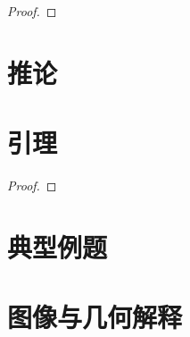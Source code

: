 \documentclass[
    lang=cn,
    color=blue,
    mode=fancy,
    thmcnt=section,
    scheme=chinese
]{elegantbook}
\begin{document}
\begin{proof}



\end{proof}


\section{推论}

\begin{corollary}[推论名称]



\end{corollary}


\section{引理}

\begin{lemma}[引理名称]



\end{lemma}


\begin{proof}



\end{proof}


\section{典型例题}

\begin{example}



\end{example}


\begin{solution}



\end{solution}


\section{图像与几何解释}
\end{document}
